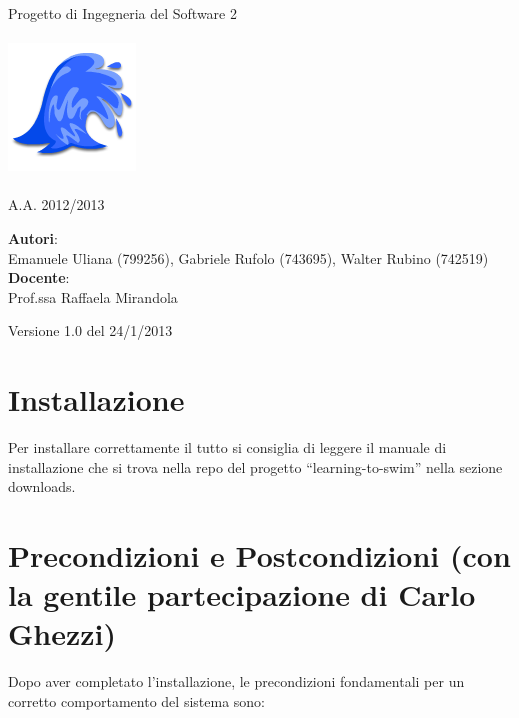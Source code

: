 \documentclass[a4paper,12pt]{article}
\begin{document}
\vspace*{\fill}
\begin{center}
{\fontsize{28}{10} \selectfont \textcolor{mygrey}{Progetto di Ingegneria del Software 2} \\[2\baselineskip]} {\fontsize{42}{10} \selectfont {\bfseries SWIMv2}} \\[4\baselineskip]
\includegraphics[scale=1]{wave-icon} \\[4\baselineskip]
{\fontsize{28}{10} \selectfont {\bfseries \textcolor{blue}{Manuale d'uso}} \\[2\baselineskip] A.A. 2012/2013}
\end{center}
\begin{flushleft}
{\fontsize{18}{10}
{\bfseries Autori}: \\ Emanuele Uliana (799256), Gabriele Rufolo (743695), Walter Rubino (742519) \\[1\baselineskip]
{\bfseries Docente}: \\ Prof.ssa Raffaela Mirandola
}
\end{flushleft}
\vspace*{\fill}
\begin{center}
Versione 1.0 del 24/1/2013 \\
\end{center}

\clearpage

	    \vspace*{\fill}
	\tableofcontents
	    \vspace*{\fill}

\clearpage

\section{Installazione}
Per installare correttamente il tutto si consiglia di leggere il manuale di installazione che si trova nella repo del progetto ``learning-to-swim'' nella sezione downloads.

\section{Precondizioni e Postcondizioni (con la gentile partecipazione di Carlo Ghezzi)}
Dopo aver completato l'installazione, le precondizioni fondamentali per un corretto comportamento del sistema sono:
\end{document}
